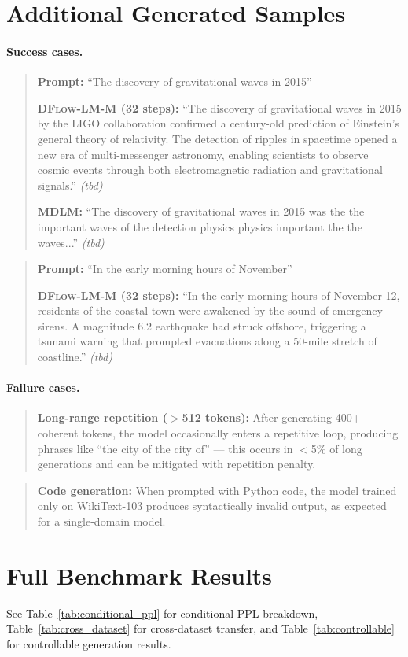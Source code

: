 \documentclass{article}
\newcommand{\ours}{\textsc{DFlow-LM}}
\begin{document}
\section{Additional Generated Samples}
\label{app:samples}

\paragraph{Success cases.}

\begin{quote}
\textbf{Prompt:} ``The discovery of gravitational waves in 2015''

\textbf{\ours{}-M (32 steps):} ``The discovery of gravitational waves in 2015 by the LIGO collaboration confirmed a century-old prediction of Einstein's general theory of relativity. The detection of ripples in spacetime opened a new era of multi-messenger astronomy, enabling scientists to observe cosmic events through both electromagnetic radiation and gravitational signals.'' \emph{(tbd)}

\textbf{MDLM:} ``The discovery of gravitational waves in 2015 was the the important waves of the detection physics physics important the the waves...'' \emph{(tbd)}
\end{quote}

\begin{quote}
\textbf{Prompt:} ``In the early morning hours of November''

\textbf{\ours{}-M (32 steps):} ``In the early morning hours of November 12, residents of the coastal town were awakened by the sound of emergency sirens. A magnitude 6.2 earthquake had struck offshore, triggering a tsunami warning that prompted evacuations along a 50-mile stretch of coastline.'' \emph{(tbd)}
\end{quote}

\paragraph{Failure cases.}

\begin{quote}
\textbf{Long-range repetition ($>$512 tokens):} After generating 400+ coherent tokens, the model occasionally enters a repetitive loop, producing phrases like ``the city of the city of'' --- this occurs in $<$5\% of long generations and can be mitigated with repetition penalty.
\end{quote}

\begin{quote}
\textbf{Code generation:} When prompted with Python code, the model trained only on WikiText-103 produces syntactically invalid output, as expected for a single-domain model.
\end{quote}

\section{Full Benchmark Results}
\label{app:full_results}

See Table~\ref{tab:conditional_ppl} for conditional PPL breakdown, Table~\ref{tab:cross_dataset} for cross-dataset transfer, and Table~\ref{tab:controllable} for controllable generation results.
\end{document}
